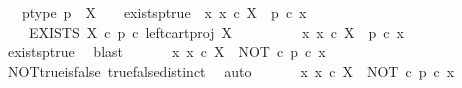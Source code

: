 \begin{isabellebody}
\ \ \ p{\isacharunderscore}{\kern0pt}type{\isacharcolon}{\kern0pt}\ {\isachardoublequoteopen}p\ {\isacharcolon}{\kern0pt}\ X\ {\isasymrightarrow}\ {\isasymOmega}{\isachardoublequoteclose}\ \ exists{\isacharunderscore}{\kern0pt}p{\isacharunderscore}{\kern0pt}true{\isacharcolon}{\kern0pt}\ {\isachardoublequoteopen}{\isasymexists}\ x{\isachardot}{\kern0pt}\ x\ {\isasymin}\isactrlsub c\ X\ {\isasymand}\ p\ {\isasymcirc}\isactrlsub c\ x\ {\isacharequal}{\kern0pt}\ {\isasymt}{\isachardoublequoteclose}\isanewline
\ \ \ \ {\isachardoublequoteopen}EXISTS\ X\ {\isasymcirc}\isactrlsub c\ {\isacharparenleft}{\kern0pt}p\ {\isasymcirc}\isactrlsub c\ left{\isacharunderscore}{\kern0pt}cart{\isacharunderscore}{\kern0pt}proj\ X\ {\isasymone}{\isacharparenright}{\kern0pt}\isactrlsup {\isasymsharp}\ {\isacharequal}{\kern0pt}\ {\isasymt}{\isachardoublequoteclose}\isanewline
%
\isadelimproof
%
\endisadelimproof
%
\isatagproof
{}\isamarkupfalse%
\ {\isacharminus}{\kern0pt}\isanewline
\ \isamarkupfalse%
\ {\isachardoublequoteopen}{\isasymnot}\ {\isacharparenleft}{\kern0pt}{\isasymforall}\ x{\isachardot}{\kern0pt}\ x\ {\isasymin}\isactrlsub c\ X\ {\isasymlongrightarrow}\ p\ {\isasymcirc}\isactrlsub c\ x\ {\isasymnoteq}\ {\isasymt}{\isacharparenright}{\kern0pt}{\isachardoublequoteclose}\isanewline
\ \ \ \isamarkupfalse%
\ exists{\isacharunderscore}{\kern0pt}p{\isacharunderscore}{\kern0pt}true\ \isamarkupfalse%
\ blast\isanewline
\ \isamarkupfalse%
\ \isamarkupfalse%
\ {\isachardoublequoteopen}{\isasymnot}\ {\isacharparenleft}{\kern0pt}{\isasymforall}\ x{\isachardot}{\kern0pt}\ x\ {\isasymin}\isactrlsub c\ X\ {\isasymlongrightarrow}\ NOT\ {\isasymcirc}\isactrlsub c\ {\isacharparenleft}{\kern0pt}p\ {\isasymcirc}\isactrlsub c\ x{\isacharparenright}{\kern0pt}\ {\isacharequal}{\kern0pt}\ {\isasymt}{\isacharparenright}{\kern0pt}{\isachardoublequoteclose}\isanewline
\ \ \ \isamarkupfalse%
\ NOT{\isacharunderscore}{\kern0pt}true{\isacharunderscore}{\kern0pt}is{\isacharunderscore}{\kern0pt}false\ true{\isacharunderscore}{\kern0pt}false{\isacharunderscore}{\kern0pt}distinct\ \isamarkupfalse%
\ auto\isanewline
\ \isamarkupfalse%
\ \isamarkupfalse%
\ {\isachardoublequoteopen}{\isasymnot}\ {\isacharparenleft}{\kern0pt}{\isasymforall}\ x{\isachardot}{\kern0pt}\ x\ {\isasymin}\isactrlsub c\ X\ {\isasymlongrightarrow}\ {\isacharparenleft}{\kern0pt}NOT\ {\isasymcirc}\isactrlsub c\ p{\isacharparenright}{\kern0pt}\ {\isasymcirc}\isactrlsub c\ x\ {\isacharequal}{\kern0pt}\ {\isasymt}{\isacharparenright}{\kern0pt}{\isachardoublequoteclose}\isanewline

\end{isabellebody}
